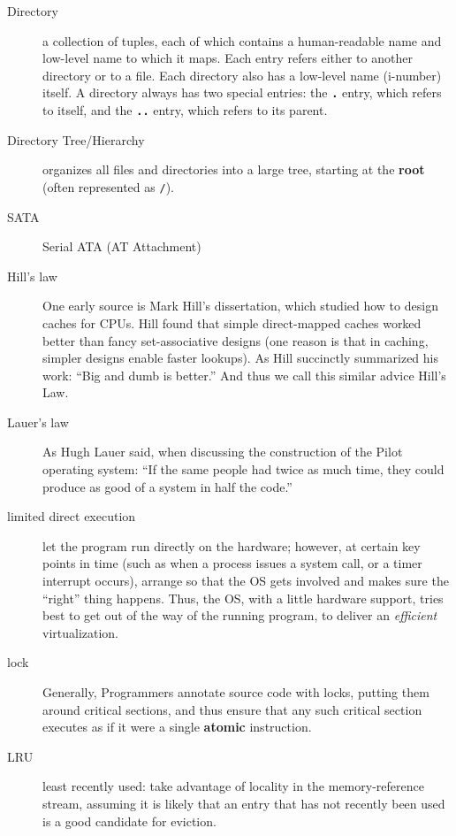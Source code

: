 \begin{description}
\item[Directory] a collection of tuples, each of which contains a human-readable name and low-level name to which it maps. Each entry refers either to another directory or to a file. Each directory also has a low-level name (i-number) itself. A directory always has two special entries: the \textbf{\texttt{.}} entry, which refers to itself, and the \textbf{\texttt{..}} entry, which refers to its parent.

\item[Directory Tree/Hierarchy] organizes all files and directories into a large tree, starting at the \textbf{root} (often represented as \texttt{/}).

\item[SATA] Serial ATA (AT Attachment)

\item[Hill's law] One early source is Mark Hill's dissertation, which studied how to design caches for CPUs. Hill found that simple direct-mapped caches worked better than fancy set-associative designs (one reason is that in caching, simpler designs enable faster lookups). As Hill succinctly summarized
  his work: ``Big and dumb is better.'' And thus we call this similar advice Hill's Law.

\item[Lauer's law] As Hugh Lauer said, when discussing the construction of the Pilot operating system: ``If the same people had twice as much time, they could produce as good of a system in half the code.''

\item[limited direct execution] let the program run directly on the hardware; however, at certain key points in time (such as when a process issues a system call, or a timer interrupt occurs), arrange so that the OS gets involved and makes sure the ``right'' thing happens.   Thus, the OS, with a little hardware support, tries best to get out of the way of the running program, to deliver an \emph{efficient} virtualization.

\item[lock] Generally, Programmers annotate source code with locks, putting them around critical sections, and thus ensure that any such critical section executes as if it were a single \textbf{atomic} instruction.

\item[LRU] least recently used: take advantage of locality in the memory-reference stream, assuming it is likely that an entry that has not recently been used is a good
candidate for eviction.


\end{description}
